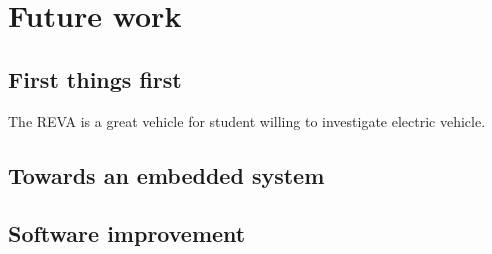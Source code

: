 \chapter{Future work \label{chap:future_work}}
\section{First things first}
The REVA is a great vehicle for student willing to investigate electric vehicle. 
\section{Towards an embedded system}
\section{Software improvement}